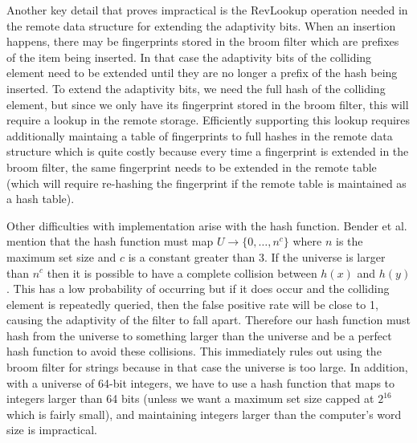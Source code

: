 \documentclass[../paper.tex]{subfiles}
\begin{document}
Another key detail that proves impractical is the RevLookup operation
needed in the remote data structure for extending the adaptivity bits. When
an insertion happens, there may be fingerprints stored in the broom filter
which are prefixes of the item being inserted. In that case the adaptivity
bits of the colliding element need to be extended until they are no longer
a prefix of the hash being inserted. To extend the adaptivity bits, we
need the full hash of the colliding element, but since we only have its
fingerprint stored in the broom filter, this will require a lookup in
the remote storage. Efficiently supporting this lookup requires additionally
maintaing a table of fingerprints to full hashes in the remote data structure
which is quite costly because every time a fingerprint is extended in the
broom filter, the same fingerprint needs to be extended in the remote table
(which will require re-hashing the fingerprint if the remote table is maintained
as a hash table).

Other difficulties with implementation arise with the hash function. Bender et al. \cite{broom-filter}
mention that the hash function must map $U \rightarrow \{0,\ldots,n^c\}$ where
$n$ is the maximum set size and $c$ is a constant greater than 3. If the universe
is larger than $n^c$ then it is possible to have a complete collision between
$h(x)$ and $h(y)$. This has a low probability of occurring but if it does
occur and the colliding element is repeatedly queried, then the false positive
rate will be close to 1, causing the adaptivity of the filter to fall apart. Therefore
our hash function must hash from the universe to something larger than the universe
and be a perfect hash function to avoid these collisions. This immediately rules
out using the broom filter for strings because in that case the universe is too large.
In addition, with a universe of 64-bit integers, we have to use a hash function
that maps to integers larger than 64 bits (unless we want a maximum set size capped
at $2^{16}$ which is fairly small), and maintaining integers larger than the computer's
word size is impractical.
\end{document}
